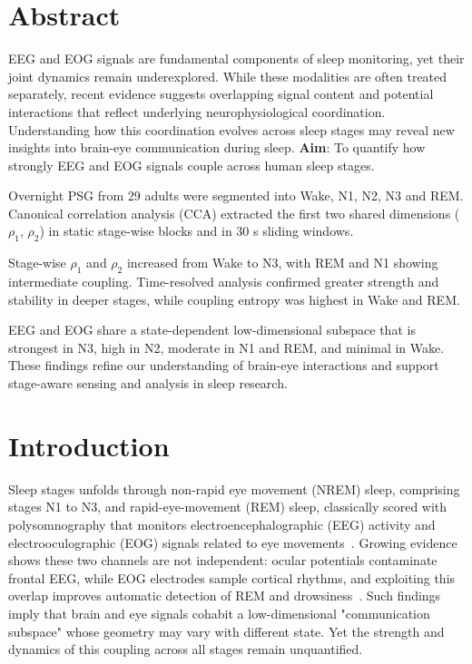 



\maketitle

\section{Abstract}

EEG and EOG signals are fundamental components of sleep monitoring, yet their joint dynamics remain underexplored. While these modalities are often treated separately, recent evidence suggests overlapping signal content and potential interactions that reflect underlying neurophysiological coordination. Understanding how this coordination evolves across sleep stages may reveal new insights into brain-eye communication during sleep.
\textbf{Aim}: To quantify how strongly EEG and EOG signals couple across human sleep stages.

Overnight PSG from 29 adults were segmented into Wake, N1, N2, N3 and REM. Canonical correlation analysis (CCA) extracted the first two shared dimensions ($\rho_1$, $\rho_2$) in static stage-wise blocks and in 30 s sliding windows.

Stage-wise $\rho_1$ and $\rho_2$ increased from Wake to N3, with REM and N1 showing intermediate coupling. Time-resolved analysis confirmed greater strength and stability in deeper stages, while coupling entropy was highest in Wake and REM.

EEG and EOG share a state-dependent low-dimensional subspace that is strongest in N3, high in N2, moderate in N1 and REM, and minimal in Wake. These findings refine our understanding of brain-eye interactions and support stage-aware sensing and analysis in sleep research.

\section{Introduction}

Sleep stages unfolds through non-rapid eye movement (NREM) sleep, comprising stages N1 to N3, and rapid-eye-movement (REM) sleep, classically scored with polysomnography that monitors electroencephalographic (EEG) activity and electrooculographic (EOG) signals related to eye movements~\cite{liu2021}. Growing evidence shows these two channels are not independent: ocular potentials contaminate frontal EEG, while EOG electrodes sample cortical rhythms, and exploiting this overlap improves automatic detection of REM and drowsiness~\cite{xu2025, safieddine2012}. Such findings imply that brain and eye signals cohabit a low-dimensional "communication subspace" whose geometry may vary with different state. Yet the strength and dynamics of this coupling across all stages remain unquantified.

